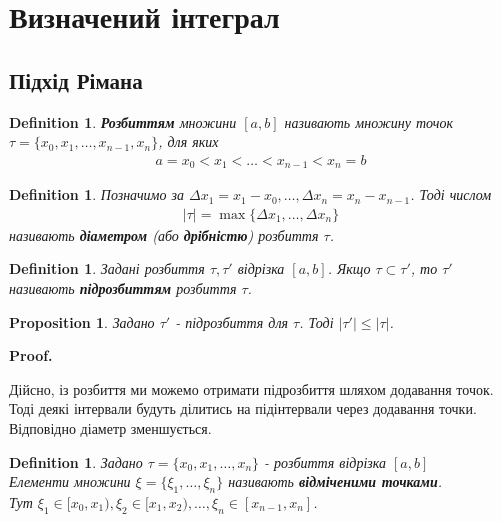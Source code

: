 \documentclass[a4paper, 10pt]{article}
\makeatletter
\def\qed{$\blacksquare$}
\theoremstyle{theoremdd}
\theoremstyle{theoremdd}
\theoremstyle{theoremdd}
\newtheorem{definition}[theorem]{Definition}
\theoremstyle{theoremdd}
\theoremstyle{theoremdd}
\theoremstyle{theoremdd}
\newtheorem{proposition}[theorem]{Proposition}
\theoremstyle{theoremdd}
\theoremstyle{theoremdd}
\theoremstyle{theoremdd}
\renewenvironment{proof}[1][Proof.\\]{\par
\pushQED{\hfill \qed}%
\normalfont \topsep6\p@\@plus6\p@\relax
\trivlist
\item\relax
{\bfseries
#1\@addpunct{.}}\hspace\labelsep\ignorespaces
}{%
\popQED\endtrivlist\@endpefalse
}
\makeatother
\begin{document}
\newpage

\section{Визначений інтеграл}
\subsection{Підхід Рімана}
\begin{definition}
\textbf{Розбиттям} множини $[a,b]$ називають множину точок $\tau = \{x_0,x_1,\dots,x_{n-1},x_n\}$, для яких
\begin{align*}
a = x_0 < x_1 < \dots < x_{n-1} < x_{n} = b
\end{align*}
\end{definition}

\begin{definition}
Позначимо за $\Delta x_1 = x_1 - x_0, \dots, \Delta x_n = x_{n} - x_{n-1}$. Тоді числом
\begin{align*}
|\tau| = \max\{\Delta x_1,\dots, \Delta x_n\}
\end{align*}
називають \textbf{діаметром} (або \textbf{дрібністю}) розбиття $\tau$.
\end{definition}

\begin{definition}
Задані розбиття $\tau, \tau'$ відрізка $[a,b]$. Якщо $\tau \subset \tau'$, то $\tau'$ називають \textbf{підрозбиттям} розбиття $\tau$.
\end{definition}

\begin{proposition}
Задано $\tau'$ - підрозбиття для $\tau$. Тоді $|\tau'| \leq |\tau|$.
\end{proposition}

\begin{proof}
Дійсно, із розбиття ми можемо отримати підрозбиття шляхом додавання точок. Тоді деякі інтервали будуть ділитись на підінтервали через додавання точки. Відповідно діаметр зменшується.
\end{proof}

\begin{definition}
Задано $\tau = \{x_0,x_1,\dots,x_n\}$ - розбиття відрізка $[a,b]$\\
Елементи множини $\xi = \{\xi_1, \dots, \xi_n \}$ називають \textbf{відміченими точками}.\\
Тут $\xi_1 \in [x_0,x_1), \xi_2 \in [x_1,x_2), \dots, \xi_n \in [x_{n-1}, x_n]$.
\end{definition}
\end{document}
